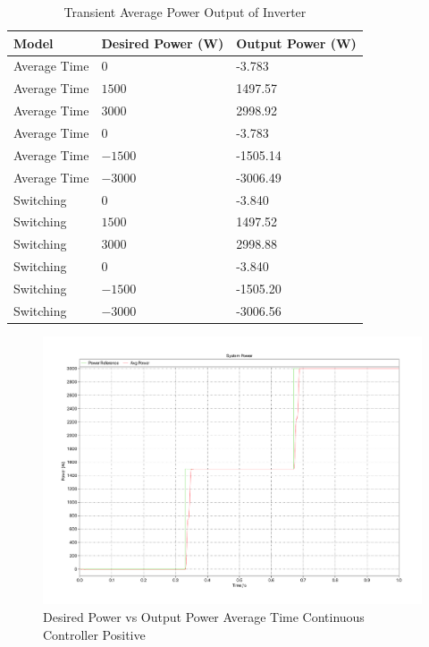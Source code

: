 \documentclass[12pt]{article}
\begin{document}
\begin{table}[ht]
    \caption{Transient Average Power Output of Inverter}
    \label{tab:c-transient}
    \centering{}
    \begin{tabular}{ l l l }
        \hline
        Model        & Desired Power (W) & Output Power (W) \\
        \hline
        Average Time & $0$               & -3.783           \\
        Average Time & $1500$            & 1497.57          \\
        Average Time & $3000$            & 2998.92          \\
        \hline
        Average Time & $0$               & -3.783           \\
        Average Time & $-1500$           & -1505.14         \\
        Average Time & $-3000$           & -3006.49         \\
        \hline
        Switching    & $0$               & -3.840           \\
        Switching    & $1500$            & 1497.52          \\
        Switching    & $3000$            & 2998.88          \\
        \hline
        Switching    & $0$               & -3.840           \\
        Switching    & $-1500$           & -1505.20         \\
        Switching    & $-3000$           & -3006.56         \\
        \hline
    \end{tabular}
\end{table}

\begin{figure}[ht]
    \centering{}
    \includegraphics[width=\textwidth, height=0.4\textheight, keepaspectratio]{img/Average Time C Power Positive.pdf}
    \caption{Desired Power vs Output Power Average Time Continuous Controller Positive}
    \label{fig:avg-time-c-power-positive}
\end{figure}
\end{document}
